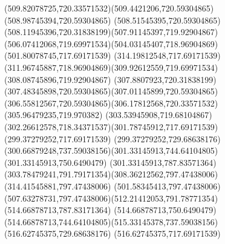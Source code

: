 {{\curveto(509.82078725,720.33571532)(509.4421206,720.59304865)(508.98745394,720.59304865)
\curveto(508.51545395,720.59304865)(508.11945396,720.31838199)(507.91145397,719.92904867)
\curveto(506.07412068,719.69971534)(504.03145407,718.96904869)(501.80078745,717.69171539)
\lineto(314.19812548,717.69171539)
\curveto(311.96745887,718.96904869)(309.92612559,719.69971534)(308.08745896,719.92904867)
\curveto(307.8807923,720.31838199)(307.48345898,720.59304865)(307.01145899,720.59304865)
\curveto(306.55812567,720.59304865)(306.17812568,720.33571532)(305.96479235,719.970382)
\curveto(303.53945908,719.68104867)(302.26612578,718.34371537)(301.78745912,717.69171539)
\lineto(299.37279252,717.69171539)
\lineto(299.37279252,729.68638176)
\curveto(300.66879248,737.59038156)(301.33145913,744.64104805)(301.33145913,750.6490479)
\lineto(301.33145913,787.83571364)
\curveto(303.78479241,791.79171354)(308.36212562,797.47438006)(314.41545881,797.47438006)
\lineto(501.58345413,797.47438006)
\curveto(507.63278731,797.47438006)(512.21412053,791.78771354)(514.66878713,787.83171364)
\lineto(514.66878713,750.6490479)
\curveto(514.66878713,744.64104805)(515.33145378,737.59038156)(516.62745375,729.68638176)
\lineto(516.62745375,717.69171539)
\closepath
}
}
{
}
{
}
